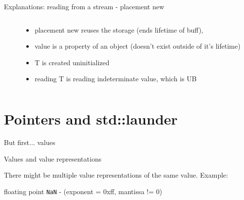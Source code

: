 \documentclass{panicsoftware-presentation}
\makeatletter
\newenvironment{itemizeSeq}{\begin{itemize}[<+-|alert@+>]}{\end{itemize}}
\makeatother
\begin{document}
\begin{frame}{Explanations: reading from a stream - placement new}

\begin{columns}

\begin{column}{0.48\linewidth}

\inputminted{\myCpp}{examples/invalid-reinterpret-cast-2-short.cpp}
\end{column}

\begin{column}{0.48\linewidth}

\begin{itemizeSeq}
\item placement new reuses the storage (ends lifetime of buff),
\item value is a property of an object (doesn't exist outside of it's lifetime)
\item T is created uninitialized
\item reading T is reading indeterminate value, which is UB
\end{itemizeSeq}
\end{column}
\end{columns}
\end{frame}

\section{Pointers and std::launder}

\begin{frame}{But first... values}
\vfill
{} 
\vfill

\vfill

\vfill

\end{frame}

\begin{frame}{Values and value representations}

There might be \alert{multiple value representations} of the same \alert{value}.
\vfill
\pause
Example:

floating point \texttt{NaN} - (exponent = 0xff, mantissa != 0)
\end{frame}
\end{document}

